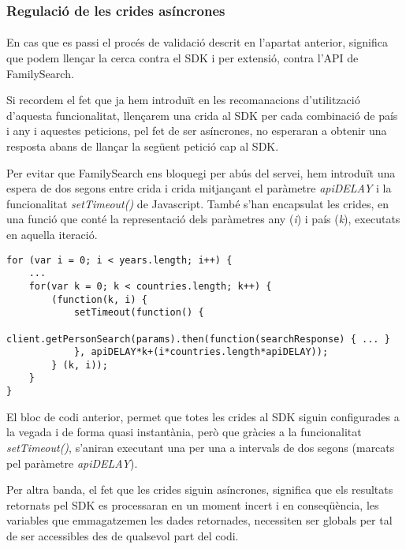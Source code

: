 \subsubsection{Regulació de les crides asíncrones}

\paragraph{}
En cas que es passi el procés de validació descrit en l'apartat anterior, significa que podem llençar la cerca contra el SDK i per extensió, contra l’API de FamilySearch.

Si recordem el fet que ja hem introduït en les recomanacions d’utilització d’aques\-ta funcionalitat, llençarem una crida al SDK per cada combinació de país i any i aques\-tes peticions, pel fet de ser asíncrones, no esperaran a obtenir una resposta abans de llançar la següent petició cap al SDK.

Per evitar que FamilySearch ens bloquegi per abús del servei, hem introduït una espera de dos segons entre crida i crida mitjançant el paràmetre \emph{apiDELAY} i la funcionalitat \emph{setTimeout()} de Javascript. També s'han encapsulat les crides, en una funció que conté la representació dels paràmetres any (\emph{i}) i país (\emph{k}), executats en aquella iteració.

\begin{lstlisting}[style=rawOwn,caption={Separació manual de les crides asíncrones al SDK}]
for (var i = 0; i < years.length; i++) {
    ...
    for(var k = 0; k < countries.length; k++) {
        (function(k, i) {
            setTimeout(function() {
                client.getPersonSearch(params).then(function(searchResponse) { ... }
            }, apiDELAY*k+(i*countries.length*apiDELAY));
        } (k, i));
    }
}
\end{lstlisting}

El bloc de codi anterior, permet que totes les crides al SDK siguin configurades a la vegada i de forma quasi instantània, però que gràcies a la funcionalitat \emph{setTimeout()}, s'aniran executant una per una a intervals de dos segons (marcats pel paràmetre \emph{apiDELAY}).

Per altra banda, el fet que les crides siguin asíncrones, significa que els resultats retornats pel SDK es processaran en un moment incert i en conseqüència, les varia\-bles que emmagatzemen les dades retornades, necessiten ser globals per tal de ser accessibles des de qualsevol part del codi.

